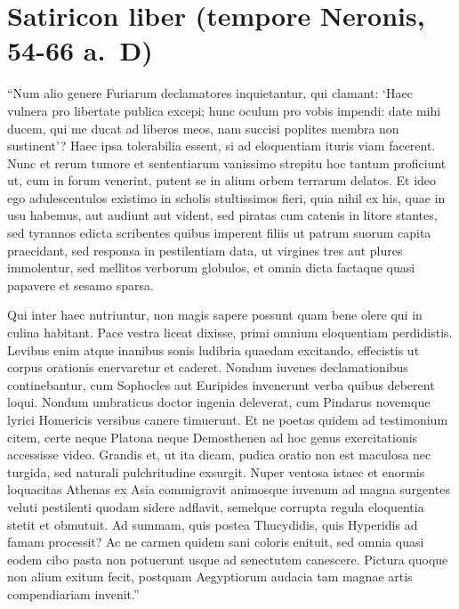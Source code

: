 

\section*{Satiricon liber (tempore Neronis, 54-66 a.~D)}

``Num alio genere Furiarum declamatores inquietantur, qui clamant: `Haec vulnera pro libertate publica excepi; hunc oculum pro vobis impendi: date mihi ducem, qui me ducat ad liberos meos, nam succisi poplites membra non sustinent'? Haec ipsa tolerabilia essent, si ad eloquentiam ituris viam facerent. Nunc et rerum tumore et sententiarum vanissimo strepitu hoc tantum proficiunt ut, cum in forum venerint, putent se in alium orbem terrarum delatos. Et ideo ego adulescentulos existimo in scholis stultissimos fieri, quia nihil ex his, quae in usu habemus, aut audiunt aut vident, sed piratas cum catenis in litore stantes, sed tyrannos edicta scribentes quibus imperent filiis ut patrum suorum capita praecidant, sed responsa in pestilentiam data, ut virgines tres aut plures immolentur, sed mellitos verborum globulos, et omnia dicta factaque quasi papavere et sesamo sparsa.

Qui inter haec nutriuntur, non magis sapere possunt quam bene olere qui in culina habitant. Pace vestra liceat dixisse, primi omnium eloquentiam perdidistis. Levibus enim atque inanibus sonis ludibria quaedam excitando, effecistis ut corpus orationis enervaretur et caderet. Nondum iuvenes declamationibus continebantur, cum Sophocles aut Euripides invenerunt verba quibus deberent loqui. Nondum umbraticus doctor ingenia deleverat, cum Pindarus novemque lyrici Homericis versibus canere timuerunt. Et ne poetas quidem ad testimonium citem, certe neque Platona neque Demosthenen ad hoc genus exercitationis accessisse video. Grandis et, ut ita dicam, pudica oratio non est maculosa nec turgida, sed naturali pulchritudine exsurgit. Nuper ventosa istaec et enormis loquacitas Athenas ex Asia commigravit animosque iuvenum ad magna surgentes veluti pestilenti quodam sidere adflavit, semelque corrupta regula eloquentia stetit et obmutuit. Ad summam, quis postea Thucydidis, quis Hyperidis ad famam processit? Ac ne carmen quidem sani coloris enituit, sed omnia quasi eodem cibo pasta non potuerunt usque ad senectutem canescere. Pictura quoque non alium exitum fecit, postquam Aegyptiorum audacia tam magnae artis compendiariam invenit.''

